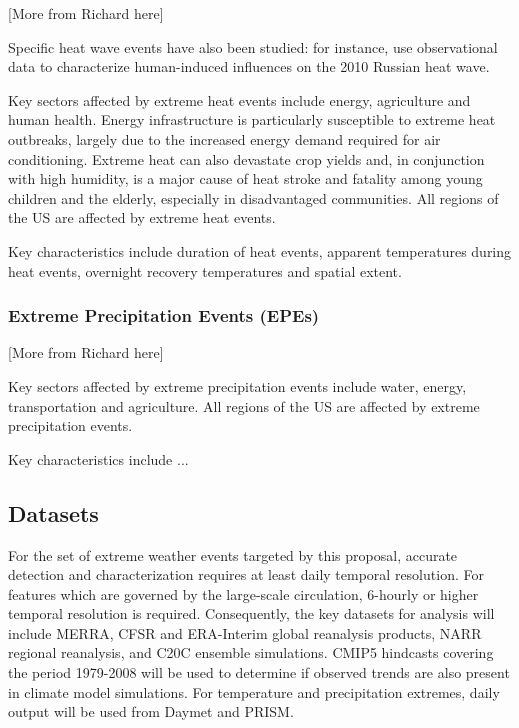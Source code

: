 \documentclass[11pt]{article}
\begin{document}
{\color{red}[More from Richard here]}

Specific heat wave events have also been studied:  for instance, \cite{dole2011grl} use observational data to characterize human-induced influences on the 2010 Russian heat wave.  

Key sectors affected by extreme heat events include energy, agriculture and human health.  Energy infrastructure is particularly susceptible to extreme heat outbreaks, largely due to the increased energy demand required for air conditioning.  Extreme heat can also devastate crop yields and, in conjunction with high humidity, is a major cause of heat stroke and fatality among young children and the elderly, especially in disadvantaged communities.  All regions of the US are affected by extreme heat events.

Key characteristics include duration of heat events, apparent temperatures during heat events, overnight recovery temperatures and spatial extent.

\subsubsection*{Extreme Precipitation Events (EPEs)}

{\color{red}[More from Richard here]}

Key sectors affected by extreme precipitation events include water, energy, transportation and agriculture.  All regions of the US are affected by extreme precipitation events.

Key characteristics include ...


\subsection{Datasets} \label{sec:Datasets}

For the set of extreme weather events targeted by this proposal, accurate detection and characterization requires at least daily temporal resolution.  For features which are governed by the large-scale circulation, 6-hourly or higher temporal resolution is required.  Consequently, the key datasets for analysis will include MERRA, CFSR and ERA-Interim global reanalysis products, NARR regional reanalysis, and C20C ensemble simulations.  CMIP5 hindcasts covering the period 1979-2008 will be used to determine if observed trends are also present in climate model simulations.  For temperature and precipitation extremes, daily output will be used from Daymet and PRISM.
\end{document}
